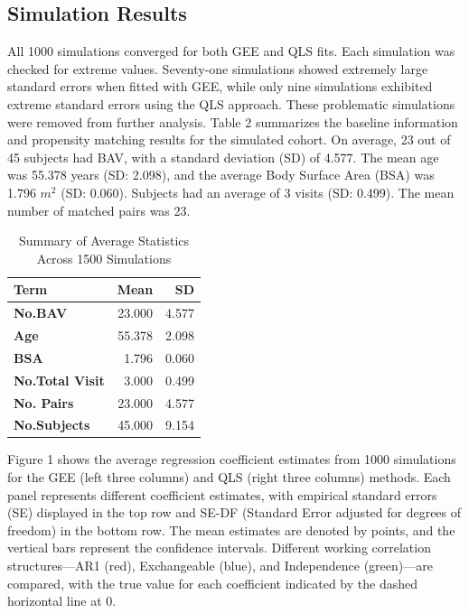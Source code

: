 \documentclass[
]{aft}
\begin{document}
\subsection{Simulation Results}\label{simulation-results}

All 1000 simulations converged for both GEE and QLS fits. Each
simulation was checked for extreme values. Seventy-one simulations
showed extremely large standard errors when fitted with GEE, while only
nine simulations exhibited extreme standard errors using the QLS
approach. These problematic simulations were removed from further
analysis. Table 2 summarizes the baseline information and propensity
matching results for the simulated cohort. On average, 23 out of 45
subjects had BAV, with a standard deviation (SD) of 4.577. The mean age
was 55.378 years (SD: 2.098), and the average Body Surface Area (BSA)
was 1.796 \(m^2\) (SD: 0.060). Subjects had an average of 3 visits (SD:
0.499). The mean number of matched pairs was 23.

\begingroup\fontsize{8}{10}\selectfont

\begin{longtable}[t]{>{}lrr}
\caption{\footnotesize Summary of Average Statistics Across 1500 Simulations}\\
\toprule
Term & Mean & SD\\
\midrule
\textbf{No.BAV} & 23.000 & 4.577\\
\textbf{Age} & 55.378 & 2.098\\
\textbf{BSA} & 1.796 & 0.060\\
\textbf{No.Total Visit} & 3.000 & 0.499\\
\textbf{No. Pairs} & 23.000 & 4.577\\
\addlinespace
\textbf{No.Subjects} & 45.000 & 9.154\\
\bottomrule
\end{longtable}
\endgroup{}

Figure 1 shows the average regression coefficient estimates from 1000
simulations for the GEE (left three columns) and QLS (right three
columns) methods. Each panel represents different coefficient estimates,
with empirical standard errors (SE) displayed in the top row and SE-DF
(Standard Error adjusted for degrees of freedom) in the bottom row. The
mean estimates are denoted by points, and the vertical bars represent
the confidence intervals. Different working correlation structures---AR1
(red), Exchangeable (blue), and Independence (green)---are compared,
with the true value for each coefficient indicated by the dashed
horizontal line at 0.
\end{document}

